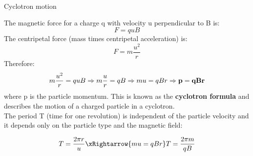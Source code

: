 %
%
%

\begin{frame}{Cyclotron motion}

The magnetic force for a charge q with velocity u perpendicular to B is:
\begin{equation*}
  F = q u B
\end{equation*}
The centripetal force (mass times centripetal acceleration) is:
\begin{equation*}
  F = m \frac{u^2}{r}
\end{equation*}
Therefore:
\begin{equation*}
  m \frac{u^2}{r} = q u B \Rightarrow
  m \frac{u}{r} = q B \Rightarrow
  m u = q B r \Rightarrow
  {\bf p = qBr}
\end{equation*}
where p is the particle momentum.
This is known as the {\bf cyclotron formula} and describes the motion of a charged particle in a cyclotron.\\
\vspace{0.2cm}
The period T (time for one revolution)
is independent of the particle velocity and it depends only on the
particle type and the magnetic field:

\begin{equation*}
  T = \frac{2\pi r}{u} \xRightarrow{m u = q B r}
  T = \frac{2\pi m}{q B}
\end{equation*}


\end{frame}


%
%
%

